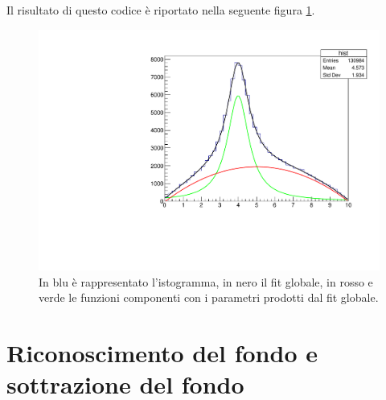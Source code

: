 \documentclass[11pt,fleqn]{book} %
\begin{document}
Il risultato di questo codice è riportato nella seguente figura \ref{fitbabbo6}.

\begin{figure}[h]
\centering
\includegraphics[scale=0.5]{Pictures/fitsecondo.pdf}
\caption{In blu è rappresentato l'istogramma, in nero il fit globale, in rosso e verde le funzioni componenti con i parametri prodotti dal fit globale. \label{fitbabbo6}}
\end{figure}

\section{Riconoscimento del fondo e sottrazione del fondo}
\end{document}
